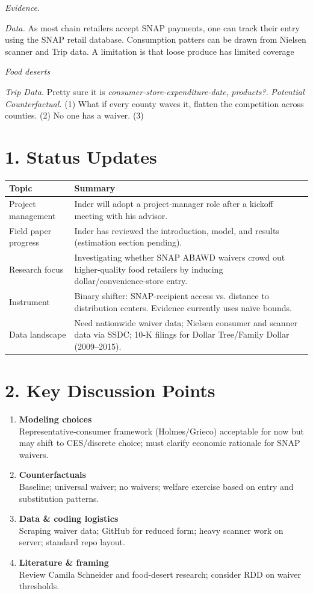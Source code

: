 \documentclass[11pt]{article}
\begin{document}
\textit{Evidence.} 

 
\textit{Data.} As most chain retailers accept SNAP payments, one can track their entry using the SNAP retail database. Consumption patters can be drawn from Nielsen scanner and Trip data. A limitation is that loose produce has limited coverage 

\textit{Food deserts}


\textit{Trip Data.} Pretty sure it is \textit{consumer-store-expenditure-date}, \textit{products?}. 
\textit{Potential Counterfactual. } (1) What if every county waves it, flatten the competition across counties. (2) No one has a waiver. (3) 

\section*{1. Status Updates}
\begin{longtable}{p{4cm}p{10cm}}
\toprule
\textbf{Topic} & \textbf{Summary}\\
\midrule
Project management & Inder will adopt a project‑manager role after a kickoff meeting with his advisor.\\
Field paper progress & Inder has reviewed the introduction, model, and results (estimation section pending).\\
Research focus & Investigating whether SNAP ABAWD waivers crowd out higher‑quality food retailers by inducing dollar/convenience‑store entry.\\
Instrument & Binary shifter: SNAP‑recipient access vs. distance to distribution centers. Evidence currently uses naïve bounds.\\
Data landscape & Need nationwide waiver data; Nielsen consumer and scanner data via SSDC; 10‑K filings for Dollar Tree/Family Dollar (2009–2015).\\
\bottomrule
\end{longtable}

\section*{2. Key Discussion Points}
\begin{enumerate}[label=\arabic*.]
    \item \textbf{Modeling choices}\\
    Representative‑consumer framework (Holmes/Grieco) acceptable for now but may shift to CES/discrete choice; must clarify economic rationale for SNAP waivers.
    \item \textbf{Counterfactuals}\\
    Baseline; universal waiver; no waivers; welfare exercise based on entry and substitution patterns.
    \item \textbf{Data \& coding logistics}\\
    Scraping waiver data; GitHub for reduced form; heavy scanner work on server; standard repo layout.
    \item \textbf{Literature \& framing}\\
    Review Camila Schneider and food‑desert research; consider RDD on waiver thresholds.
\end{enumerate}
\end{document}
